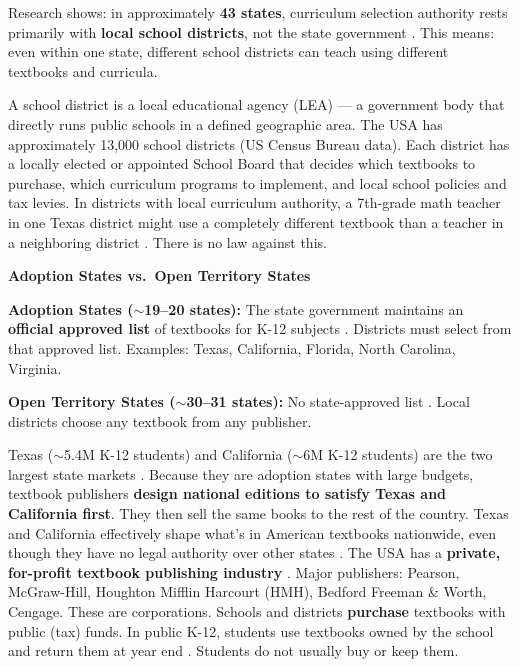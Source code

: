 Research shows: in approximately \textbf{43 states}, curriculum selection authority rests primarily with \textbf{local school districts}, not the state government \cite{textbook-adoption-states}. This means: even within one state, different school districts can teach using different textbooks and curricula.


A school district is a local educational agency (LEA) — a government body that directly runs public schools in a defined geographic area. The USA has approximately 13,000 school districts (US Census Bureau data). Each district has a locally elected or appointed School Board that decides which textbooks to purchase, which curriculum programs to implement, and local school policies and tax levies. In districts with local curriculum authority, a 7th-grade math teacher in one Texas district might use a completely different textbook than a teacher in a neighboring district \cite{textbook-adoption-states}. There is no law against this.

\textbf{Adoption States vs.\ Open Territory States}

\textbf{Adoption States ($\sim$19--20 states):} The state government maintains an \textbf{official approved list} of textbooks for K-12 subjects \cite{textbook-adoption-states}. Districts must select from that approved list. Examples: Texas, California, Florida, North Carolina, Virginia.

\textbf{Open Territory States ($\sim$30--31 states):} No state-approved list \cite{textbook-adoption-states}. Local districts choose any textbook from any publisher.

Texas ($\sim$5.4M K-12 students) and California ($\sim$6M K-12 students) are the two largest state markets \cite{nces-digest}. Because they are adoption states with large budgets, textbook publishers \textbf{design national editions to satisfy Texas and California first}. They then sell the same books to the rest of the country. Texas and California effectively shape what's in American textbooks nationwide, even though they have no legal authority over other states \cite{textbook-adoption-states}. The USA has a \textbf{private, for-profit textbook publishing industry} \cite{textbook-adoption-states}. Major publishers: Pearson, McGraw-Hill, Houghton Mifflin Harcourt (HMH), Bedford Freeman \& Worth, Cengage. These are corporations. Schools and districts \textbf{purchase} textbooks with public (tax) funds. In public K-12, students use textbooks owned by the school and return them at year end \cite{us-ed-gov-k12}. Students do not usually buy or keep them.

